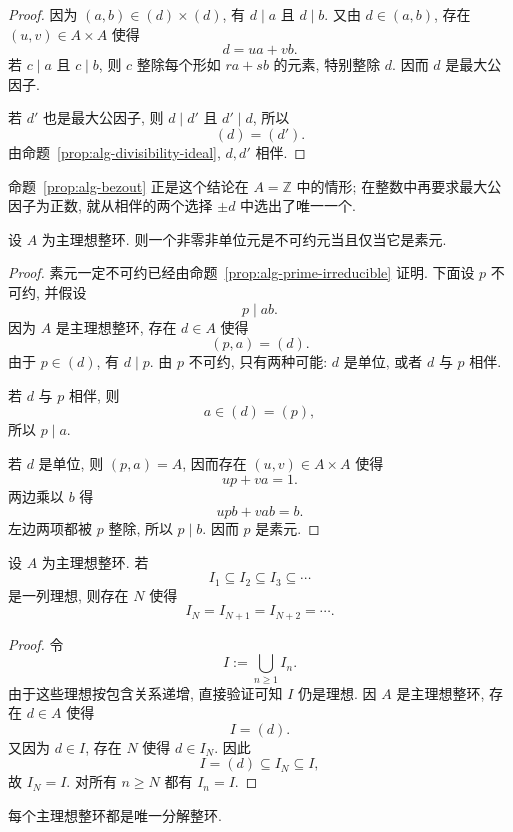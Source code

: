 \documentclass[usesamecnt, thmcnt=section, lang=cn, newtx, 10pt, scheme=chinese]{elegantbook}
\begin{document}
\begin{proof}
因为 $(a,b)\in(d)\times(d)$, 有 $d\mid a$ 且 $d\mid b$. 又由 $d\in(a,b)$, 存在 $(u,v)\in A\times A$ 使得
\[
 d=ua+vb.
\]
若 $c\mid a$ 且 $c\mid b$, 则 $c$ 整除每个形如 $ra+sb$ 的元素, 特别整除 $d$. 因而 $d$ 是最大公因子.

若 $d'$ 也是最大公因子, 则 $d\mid d'$ 且 $d'\mid d$, 所以
\[
 (d)=(d').
\]
由命题~\ref{prop:alg-divisibility-ideal}, $d,d'$ 相伴.
\end{proof}

命题~\ref{prop:alg-bezout} 正是这个结论在 $A=\mathbb Z$ 中的情形; 在整数中再要求最大公因子为正数, 就从相伴的两个选择 $\pm d$ 中选出了唯一一个.

\begin{proposition}\label{prop:alg-pid-irreducible-prime}
设 $A$ 为主理想整环. 则一个非零非单位元是不可约元当且仅当它是素元.
\end{proposition}

\begin{proof}
素元一定不可约已经由命题~\ref{prop:alg-prime-irreducible} 证明. 下面设 $p$ 不可约, 并假设
\[
 p\mid ab.
\]
因为 $A$ 是主理想整环, 存在 $d\in A$ 使得
\[
 (p,a)=(d).
\]
由于 $p\in(d)$, 有 $d\mid p$. 由 $p$ 不可约, 只有两种可能: $d$ 是单位, 或者 $d$ 与 $p$ 相伴.

若 $d$ 与 $p$ 相伴, 则
\[
 a\in(d)=(p),
\]
所以 $p\mid a$.

若 $d$ 是单位, 则 $(p,a)=A$, 因而存在 $(u,v)\in A\times A$ 使得
\[
 up+va=1.
\]
两边乘以 $b$ 得
\[
 upb+vab=b.
\]
左边两项都被 $p$ 整除, 所以 $p\mid b$. 因而 $p$ 是素元.
\end{proof}

\begin{lemma}\label{lem:alg-pid-acc}
设 $A$ 为主理想整环. 若
\[
 I_1\subseteq I_2\subseteq I_3\subseteq\cdots
\]
是一列理想, 则存在 $N$ 使得
\[
 I_N=I_{N+1}=I_{N+2}=\cdots.
\]
\end{lemma}

\begin{proof}
令
\[
 I:=\bigcup_{n\geq1}I_n.
\]
由于这些理想按包含关系递增, 直接验证可知 $I$ 仍是理想. 因 $A$ 是主理想整环, 存在 $d\in A$ 使得
\[
 I=(d).
\]
又因为 $d\in I$, 存在 $N$ 使得 $d\in I_N$. 因此
\[
 I=(d)\subseteq I_N\subseteq I,
\]
故 $I_N=I$. 对所有 $n\geq N$ 都有 $I_n=I$.
\end{proof}

\begin{theorem}\label{thm:alg-pid-ufd}
每个主理想整环都是唯一分解整环.
\end{theorem}
\end{document}

